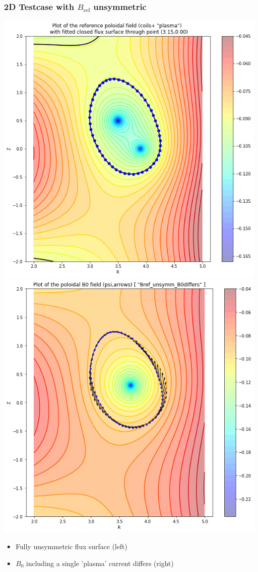 \documentclass[aspectratio=169]{beamer}
\begin{document}
\begin{frame}
 \frametitle{2D Testcase with $B_\text{ref}$ unsymmetric}
 \small\centering
 \includegraphics[height=0.75\textheight]{pics/Bref_unsymm_full_field_zoom_curve_fit.png}
   \includegraphics[height=0.75\textheight]{pics/Bref_unsymm_B0_differs.png}\\
  \begin{itemize}
   \item Fully unsymmetric flux surface (left)
   \item $B_0$  including a single 'plasma' current differs (right)
  \end{itemize}
 \end{frame}
 
\end{document}
